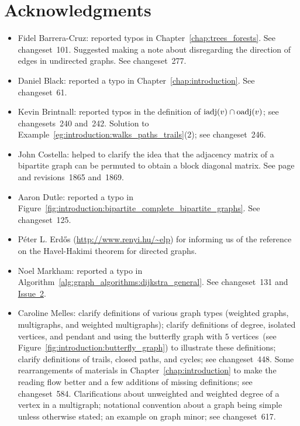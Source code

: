 
\chapter{Acknowledgments}

\begin{itemize}
\item Fidel Barrera-Cruz: reported typos in
  Chapter~\ref{chap:trees_forests}. See changeset~101. Suggested
  making a note about disregarding the direction of edges in
  undirected graphs. See changeset~277.

\item Daniel Black: reported a typo in
  Chapter~\ref{chap:introduction}. See changeset~61.

\item Kevin Brintnall: reported typos in the definition of
  $\operatorname*{iadj}(v) \cap \operatorname*{oadj}(v)$; see changesets~240 and~242. Solution to
  Example~\ref{eg:introduction:walks_paths_trails}(2); see changeset~246.

\item John Costella: helped to clarify the idea that the adjacency
  matrix of a bipartite graph can be permuted to obtain a block
  diagonal matrix. See page~\pageref{sec:introduction:bipartite_case}
  and revisions~1865 and~1869.

\item Aaron Dutle: reported a typo in
  Figure~\ref{fig:introduction:bipartite_complete_bipartite_graphs}. See
  changeset~125.

\item P\'eter L. Erd\H{o}s (\url{http://www.renyi.hu/~elp}) for informing
  us of the reference~\cite{ErdosEtAl2010} on the Havel-Hakimi
  theorem for directed graphs.

\item Noel Markham: reported a typo in
  Algorithm~\ref{alg:graph_algorithms:dijkstra_general}. See
  changeset~131 and
  \href{http://code.google.com/p/graph-theory-algorithms-book/issues/detail?id=2}{Issue~2}.

\item Caroline Melles: clarify definitions of various graph types
  (weighted graphs, multigraphs, and weighted multigraphs); clarify
  definitions of degree, isolated vertices, and pendant and using the
  butterfly graph with $5$ vertices~(see
  Figure~\ref{fig:introduction:butterfly_graph}) to
  illustrate these definitions; clarify definitions of trails, closed
  paths, and cycles; see changeset~448. Some rearrangements of
  materials in Chapter~\ref{chap:introduction} to make the reading
  flow better and a few additions of missing definitions; see
  changeset~584. Clarifications about unweighted and weighted
  degree of a vertex in a multigraph; notational convention about a
  graph being simple unless otherwise stated; an example on graph
  minor; see changeset~617.


\end{itemize}
